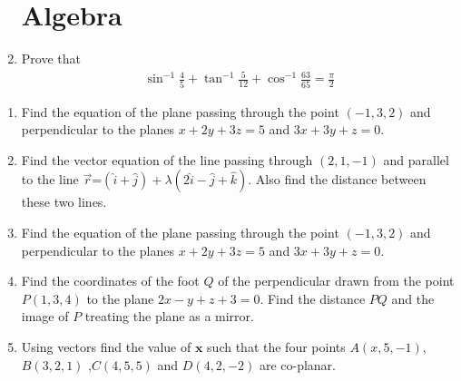 \documentclass[12pt,-letter paper]{article}
\let\vec\mathbf{}
\let\vec\mathbf{}
\let\vec\mathbf{}
\let\vec\mathbf
\providecommand{\brak}[1]{\ensuremath{\left(#1\right)}}
\begin{document}
\begin{enumerate}

\section*{Algebra}
\item Prove that 
\begin{align*}
    \sin^{-1}\frac{4}{5}+\tan^{-1}\frac{5}{12}+\cos^{-1}\frac{63}{65}=\frac{\pi}{2}
\end{align*}

\end{enumerate}

\begin{enumerate}
\section*{Vector Algebra}
 
\item Find the equation of the plane passing through the point $\brak{-1,3,2}$ and perpendicular to the planes $x+2y+3z=5$ and $3x+3y+z=0$.

\item Find the vector equation of the line passing through $\brak{2,1,-1}$ and parallel to the line $\overrightarrow{r}$=$\brak{\hat{i}+\hat{j}}+\lambda\brak{2\hat{i}-\hat{j}+\hat{k}}$. Also find the distance between these two lines.

 \item Find the equation of the plane passing through the point $(-1,3,2)$ and perpendicular to the planes $x+2y+3z=5$ and $3x+3y+z=0$.
 
\item Find the coordinates of the foot $Q$ of the perpendicular drawn from the point $P\brak{1,3,4}$ to the plane $2x-y+z+3=0$. Find the distance $PQ$ and the image of $P$ treating the plane as a mirror. 

\item Using vectors find the value of $\vec{x}$ such that the four points $A\brak{x,5,-1}$, $B\brak{3,2,1}$ ,$C\brak{4,5,5}$ and $D\brak{4,2,-2}$ are co-planar.

\end{enumerate}
\end{document}
